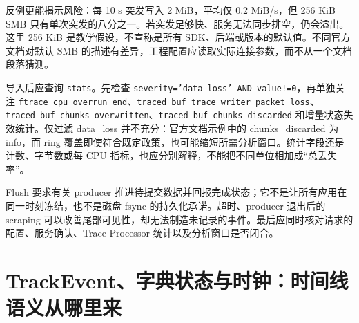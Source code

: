 \documentclass[UTF8,fontset=fandol,openany,11pt]{ctexbook}
\begin{document}
反例更能揭示风险：每 10 s 突发写入 2 MiB，平均仅 0.2 MiB/s，但 256 KiB SMB 只有单次突发的八分之一。若突发足够快、服务无法同步排空，仍会溢出。这里 256 KiB 是教学假设，不宣称是所有 SDK、后端或版本的默认值。不同官方文档对默认 SMB 的描述有差异，工程配置应读取实际连接参数，而不从一个文档段落猜测。\cite{pf-buffers}\cite{pf-service}


导入后应查询 \texttt{stats}。先检查 \texttt{severity='data\_\allowbreak{}loss' AND value!=0}，再单独关注 \texttt{ftrace\_\allowbreak{}cpu\_\allowbreak{}overrun\_\allowbreak{}end}、\texttt{traced\_\allowbreak{}buf\_\allowbreak{}trace\_\allowbreak{}writer\_\allowbreak{}packet\_\allowbreak{}loss}、\texttt{traced\_\allowbreak{}buf\_\allowbreak{}chunks\_\allowbreak{}overwritten}、\texttt{traced\_\allowbreak{}buf\_\allowbreak{}chunks\_\allowbreak{}discarded} 和增量状态失效统计。仅过滤 data\_\allowbreak{}loss 并不充分：官方文档示例中的 chunks\_\allowbreak{}discarded 为 info，而 ring 覆盖即使符合既定政策，也可能缩短所需分析窗口。统计字段还是计数、字节数或每 CPU 指标，也应分别解释，不能把不同单位相加成“总丢失率”。\cite{pf-buffers}\cite{pf-reader}


Flush 要求有关 producer 推进待提交数据并回报完成状态；它不是让所有应用在同一时刻冻结，也不是磁盘 fsync 的持久化承诺。超时、producer 退出后的 scraping 可以改善尾部可见性，却无法制造未记录的事件。最后应同时核对请求的配置、服务确认、Trace Processor 统计以及分析窗口是否闭合。\cite{pf-service-impl}


\section{TrackEvent、字典状态与时钟：时间线语义从哪里来}
\end{document}

